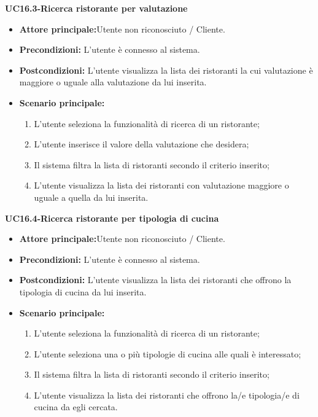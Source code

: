 \textbf{UC16.3-Ricerca ristorante per valutazione}
\begin{itemize}
\item \textbf{Attore principale:}Utente non riconosciuto / Cliente.
\item \textbf{Precondizioni:} L'utente è connesso al sistema.
\item \textbf{Postcondizioni:} L'utente visualizza la lista dei ristoranti la cui valutazione è maggiore o uguale alla
valutazione da lui inserita.
\item \textbf{Scenario principale:}
\begin{enumerate}
    \item L'utente seleziona la funzionalità di ricerca di un ristorante;
    \item L'utente inserisce il valore della valutazione che desidera;
    \item Il sistema filtra la lista di ristoranti secondo il criterio inserito;
    \item L'utente visualizza la lista dei ristoranti con valutazione maggiore o uguale a quella da lui inserita.
\end{enumerate}
\end{itemize}

\pagebreak

\textbf{UC16.4-Ricerca ristorante per tipologia di cucina}
\begin{itemize}
\item \textbf{Attore principale:}Utente non riconosciuto / Cliente.
\item \textbf{Precondizioni:} L'utente è connesso al sistema.
\item \textbf{Postcondizioni:} L'utente visualizza la lista dei ristoranti che offrono la tipologia di cucina
da lui inserita.
\item \textbf{Scenario principale:}
\begin{enumerate}
    \item L'utente seleziona la funzionalità di ricerca di un ristorante;
    \item L'utente seleziona una o più tipologie di cucina alle quali è interessato;
    \item Il sistema filtra la lista di ristoranti secondo il criterio inserito;
    \item L'utente visualizza la lista dei ristoranti che offrono la/e tipologia/e di cucina da egli cercata.
\end{enumerate}
\end{itemize}

